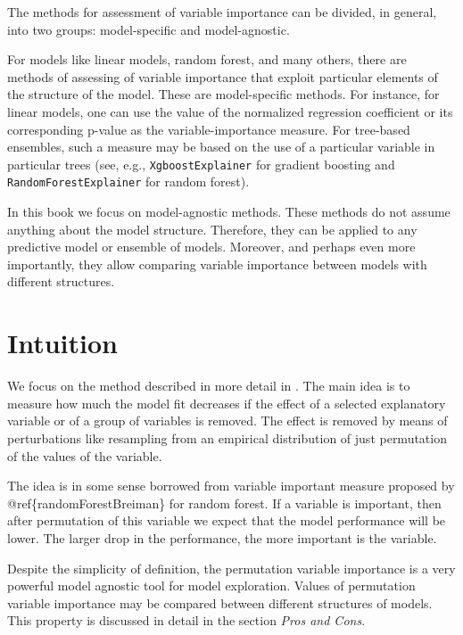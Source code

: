\documentclass[]{krantz}
\begin{document}
The methods for assessment of variable importance can be divided, in general, into two groups: model-specific and model-agnostic.

For models like linear models, random forest, and many others, there are methods of assessing of variable importance that exploit particular elements of the structure of the model. These are model-specific methods. For instance, for linear models, one can use the value of the normalized regression coefficient or its corresponding p-value as the variable-importance measure. For tree-based ensembles, such a measure may be based on the use of a particular variable in particular trees (see, e.g., \texttt{XgboostExplainer} \citep{xgboostExplainer} for gradient boosting and \texttt{RandomForestExplainer} \citep{randomForestExplainer} for random forest).

In this book we focus on model-agnostic methods. These methods do not assume anything about the model structure. Therefore, they can be applied to any predictive model or ensemble of models. Moreover, and perhaps even more importantly, they allow comparing variable importance between models with different structures.

\hypertarget{featureImportanceIntuition}{%
\section{Intuition}\label{featureImportanceIntuition}}

We focus on the method described in more detail in \citep{variableImportancePermutations}. The main idea is to measure how much the model fit decreases if the effect of a selected explanatory variable or of a group of variables is removed. The effect is removed by means of perturbations like resampling from an empirical distribution of just permutation of the values of the variable.

The idea is in some sense borrowed from variable important measure proposed by @ref\{randomForestBreiman\} for random forest. If a variable is important, then after permutation of this variable we expect that the model performance will be lower. The larger drop in the performance, the more important is the variable.

Despite the simplicity of definition, the permutation variable importance is a very powerful model agnostic tool for model exploration. Values of permutation variable importance may be compared between different structures of models. This property is discussed in detail in the section \emph{Pros and Cons}.
\end{document}

